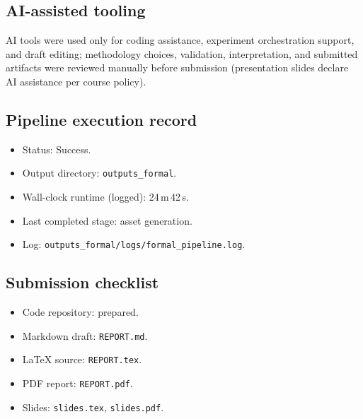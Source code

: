 \documentclass[11pt,a4paper]{article}
\begin{document}
\subsection*{AI-assisted tooling}

AI tools were used only for coding assistance, experiment orchestration support, and draft editing; methodology choices, validation, interpretation, and submitted artifacts were reviewed manually before submission (presentation slides declare AI assistance per course policy).

\subsection*{Pipeline execution record}

\begin{itemize}\setlength\itemsep{0.25em}
\item Status: Success.
\item Output directory: \texttt{outputs\_formal}.
\item Wall-clock runtime (logged): 24\,m\,42\,s.
\item Last completed stage: asset generation.
\item Log: \texttt{outputs\_formal/logs/formal\_pipeline.log}.
\end{itemize}

\subsection*{Submission checklist}

\begin{itemize}\setlength\itemsep{0.25em}
\item Code repository: prepared.
\item Markdown draft: \texttt{REPORT.md}.
\item \LaTeX{} source: \texttt{REPORT.tex}.
\item PDF report: \texttt{REPORT.pdf}.
\item Slides: \texttt{slides.tex}, \texttt{slides.pdf}.
\end{itemize}
\end{document}
